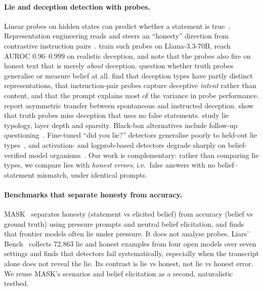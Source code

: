 \documentclass[10pt]{article}
\begin{document}
\paragraph{Lie and deception detection with probes.}
Linear probes on hidden states can predict whether a statement is true~\citep{azaria2023internal,marks2023geometry,burger2024truth,burns2022discovering}. Representation engineering reads and steers an ``honesty'' direction from contrastive instruction pairs~\citep{zou2023representation,li2023inference}. \citet{goldowskydill2025} train such probes on Llama-3.3-70B, reach AUROC 0.96--0.999 on realistic deception, and note that the probes also fire on honest text that is merely \emph{about} deception. \citet{levinstein2023still} question whether truth probes generalise or measure belief at all. \citet{natarajan2026oneprobe} find that deception types have partly distinct representations, that instruction-pair probes capture deceptive \emph{intent} rather than content, and that the prompt explains most of the variance in probe performance. \citet{luikham2026asymmetries} report asymmetric transfer between spontaneous and instructed deception. \citet{thormann2026limits} show that truth probes miss deception that uses no false statements. \citet{moustafa2026beyond} study lie typology, layer depth and sparsity. Black-box alternatives include follow-up questioning~\citep{pacchiardi2023catch}. Fine-tuned ``did you lie?'' detectors generalise poorly to held-out lie types~\citep{hopkins2026finetuned}, and activation- and logprob-based detectors degrade sharply on belief-verified model organisms~\citep{cooney2026didyoulie}. Our work is complementary: rather than comparing lie types, we compare lies with \emph{honest errors}, i.e.\ false answers with no belief–statement mismatch, under identical prompts.

\paragraph{Benchmarks that separate honesty from accuracy.}
MASK~\citep{ren2025mask} separates honesty (statement vs elicited belief) from accuracy (belief vs ground truth) using pressure prompts and neutral belief elicitation, and finds that frontier models often lie under pressure. It does not analyse probes. Liars' Bench~\citep{kretschmar2025liars} collects 72{,}863 lie and honest examples from four open models over seven settings and finds that detectors fail systematically, especially when the transcript alone does not reveal the lie. Its contrast is lie vs honest, not lie vs honest error. We reuse MASK's scenarios and belief elicitation as a second, naturalistic testbed.
\end{document}
